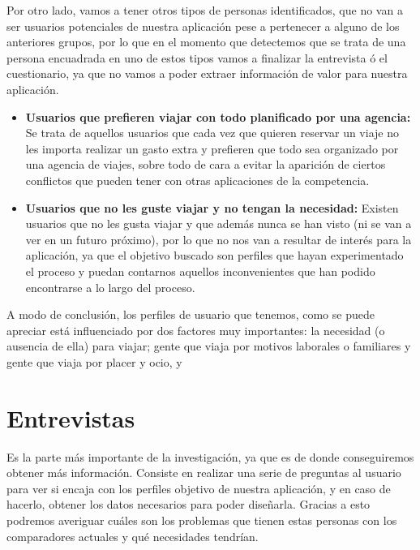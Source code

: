 Por otro lado, vamos a tener otros tipos de personas identificados, que no van a ser usuarios potenciales de nuestra aplicación pese a pertenecer a 
alguno de los anteriores grupos, por lo que en el momento que detectemos que se trata de una persona encuadrada en uno de estos tipos
vamos a finalizar la entrevista ó el cuestionario, ya que no vamos a poder extraer información de valor para nuestra aplicación.


\begin{itemize}
    \item {\textbf{Usuarios que prefieren viajar con todo planificado por una agencia:}} Se trata de aquellos usuarios que cada vez que quieren
        reservar un viaje no les importa realizar un gasto extra y prefieren que todo sea organizado por una agencia de viajes, sobre todo de cara a
        evitar la aparición de ciertos conflictos que pueden tener con otras aplicaciones de la competencia.
    \item {\textbf{Usuarios que no les guste viajar y no tengan la necesidad:}} Existen usuarios que no les gusta viajar y que además nunca se han visto
        (ni se van a ver en un futuro próximo), por lo que no nos van a resultar de interés para la aplicación, ya que el objetivo buscado son perfiles que
        hayan experimentado el proceso y puedan contarnos aquellos inconvenientes que han podido encontrarse a lo largo del proceso.
\end{itemize}
 
A modo de conclusión, los perfiles de usuario que tenemos, como se puede apreciar está influenciado por dos factores muy importantes: la necesidad (o ausencia de ella) para viajar; gente que viaja por motivos laborales o familiares y gente que viaja por placer y ocio, y

\section{Entrevistas}

Es la parte más importante de la investigación, ya que es de donde conseguiremos obtener más información. Consiste en realizar una serie de preguntas al usuario para
ver si encaja con los perfiles objetivo de nuestra aplicación, y en caso de hacerlo, obtener los datos necesarios para poder diseñarla. Gracias a esto podremos averiguar
cuáles son los problemas que tienen estas personas con los comparadores actuales y qué necesidades tendrían.

